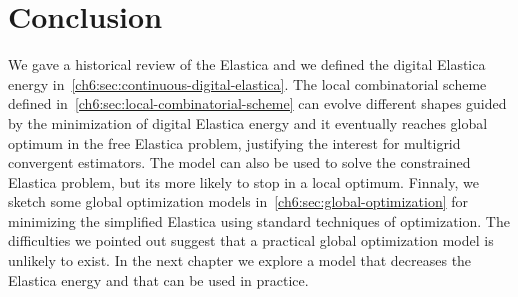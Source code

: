 \section{Conclusion}
\label{ch6:sec:conclusion}
We gave a historical review of the Elastica and we defined the digital Elastica energy in~\cref{ch6:sec:continuous-digital-elastica}. The local combinatorial scheme defined in~\cref{ch6:sec:local-combinatorial-scheme} can evolve different shapes guided by the minimization of digital Elastica energy and it eventually reaches global optimum in the free Elastica problem, justifying the interest for multigrid convergent estimators. The model can also be used to solve the constrained Elastica problem, but its more likely to stop in a local optimum. Finnaly, we sketch some global optimization models in~\cref{ch6:sec:global-optimization} for minimizing the simplified Elastica using standard techniques of optimization. The difficulties we pointed out suggest that a practical global optimization model is unlikely to exist. In the next chapter we explore a model that decreases the Elastica energy and that can be used in practice.

